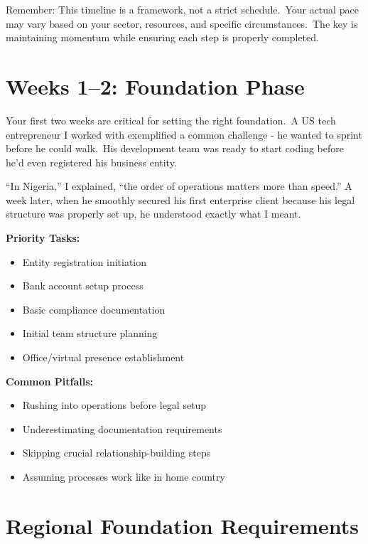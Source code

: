 \begin{warningbox}
Remember: This timeline is a framework, not a strict schedule.\ Your actual pace may vary based on your sector, resources, and specific circumstances.\ The key is maintaining momentum while ensuring each step is properly completed.
\end{warningbox}

\section{Weeks 1--2: Foundation Phase}\label{sec:foundation-phase}

Your first two weeks are critical for setting the right foundation.\ A US tech entrepreneur I worked with exemplified a common challenge - he wanted to sprint before he could walk.\ His development team was ready to start coding before he'd even registered his business entity.

``In Nigeria,'' I explained, ``the order of operations matters more than speed.'' A week later, when he smoothly secured his first enterprise client because his legal structure was properly set up, he understood exactly what I meant.

\begin{tcolorbox}[colback=white,colframe=primarydark,title=\textbf{First Two Weeks Checklist}]
\textbf{Priority Tasks:}
\begin{itemize}
    \item Entity registration initiation
    \item Bank account setup process
    \item Basic compliance documentation
    \item Initial team structure planning
    \item Office/virtual presence establishment
\end{itemize}

\textbf{Common Pitfalls:}
\begin{itemize}
    \item Rushing into operations before legal setup
    \item Underestimating documentation requirements
    \item Skipping crucial relationship-building steps
    \item Assuming processes work like in home country
\end{itemize}
\end{tcolorbox}

\section{Regional Foundation Requirements}\label{sec:regional-foundation}

